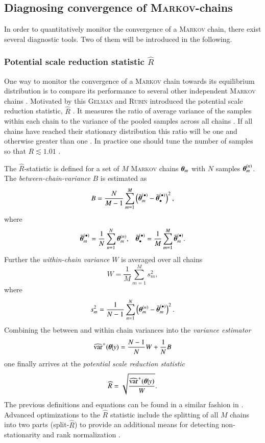 \subsection{Diagnosing convergence of \textsc{Markov}-chains}
In order to quantitatively monitor the convergence of a \textsc{Markov} chain, there exist several diagnostic tools. Two of them will be introduced in the following. 
\subsubsection{Potential scale reduction statistic $\widehat{R}$}
One way to monitor the convergence of a \textsc{Markov} chain towards its equilibrium distribution is to compare its performance to several other independent \textsc{Markov} chains \cite{stan}. Motivated by this \textsc{Gelman} and \textsc{Rubin} introduced the potential scale reduction statistic, $\widehat{R}$ \cite{rhatorig}. It measures the ratio of average variance of the samples within each chain to the variance of the pooled samples across all chains \cite{stan}. If all chains have reached their stationary distribution this ratio will be one and otherwise greater than one \cite{stan}. In practice one should tune the number of samples so that $R\lesssim1.01$ \cite{rhat}. 

The $\widehat{R}$-statistic is defined for a set of $M$ \textsc{Markov} chains $\boldsymbol{\theta}_m$ with $N$ samples $\boldsymbol{\theta}_m^{(n)}$. The \emph{between-chain-variance} $B$ is estimated as \begin{equation}
	B=\frac{N}{M-1}\sum_{m=1}^{M}\left(\bar{\boldsymbol{\theta}}_m^{(\bullet)}-\bar{\boldsymbol{\theta}}^{(\bullet)}_\bullet\right)^2,
\end{equation}
where
\begin{align}
	\bar{\boldsymbol{\theta}}_m^{(\bullet)}=\frac{1}{N}\sum_{n=1}^{N}\boldsymbol{\theta}_m^{(n)}, && \bar{\boldsymbol{\theta}}^{(\bullet)}_\bullet=\frac{1}{M}\sum_{m=1}^{M}\bar{\boldsymbol{\theta}}_m^{(\bullet)}. 
\end{align}
Further the \emph{within-chain variance} $W$ is averaged over all chains
\begin{equation}
	W=\frac{1}{M}\sum_{m=1}^{M}s_m^2,
\end{equation}
where \begin{equation}
	s_m^2=\frac{1}{N-1}\sum_{n=1}^{N}\left(\boldsymbol{\theta}_m^{(n)}-\bar{\boldsymbol{\theta}}_m^{(\bullet)}\right)^2.
\end{equation}
Combining the between and within chain variances into the \emph{variance estimator}
\begin{equation}
	\widehat{\text{var}}^+(\boldsymbol{\theta}|y)=\frac{N-1}{N}W+\frac{1}{N}B
\end{equation}
one finally arrives at the \emph{potential scale reduction statistic}
\begin{equation}
	\widehat{R}=\sqrt{\frac{\widehat{\text{var}}^+(\boldsymbol{\theta}|y)}{W}}.
\end{equation} 
The previous definitions and equations can be found in a similar fashion in \cite{stan}. Advanced optimizations to the $\widehat{R}$ statistic include the splitting of all $M$ chains into two parts (split-$\widehat{R}$) to provide an additional means for detecting non-stationarity \cite{stan} and rank normalization \cite{rhat}.
